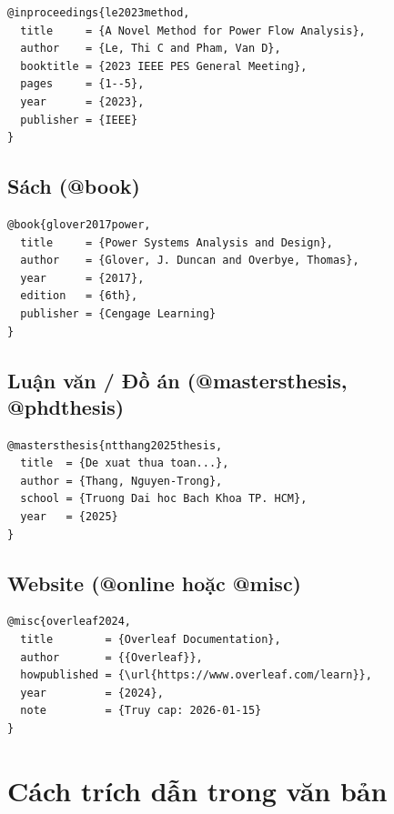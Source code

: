 \begin{lstlisting}[style=latexstyle, caption={Entry @inproceedings mẫu}]
@inproceedings{le2023method,
  title     = {A Novel Method for Power Flow Analysis},
  author    = {Le, Thi C and Pham, Van D},
  booktitle = {2023 IEEE PES General Meeting},
  pages     = {1--5},
  year      = {2023},
  publisher = {IEEE}
}
\end{lstlisting}

\subsection{Sách (@book)}

\begin{lstlisting}[style=latexstyle, caption={Entry @book mẫu}]
@book{glover2017power,
  title     = {Power Systems Analysis and Design},
  author    = {Glover, J. Duncan and Overbye, Thomas},
  year      = {2017},
  edition   = {6th},
  publisher = {Cengage Learning}
}
\end{lstlisting}

\subsection{Luận văn / Đồ án (@mastersthesis, @phdthesis)}

\begin{lstlisting}[style=latexstyle, caption={Entry luận văn mẫu}]
@mastersthesis{ntthang2025thesis,
  title  = {De xuat thua toan...},
  author = {Thang, Nguyen-Trong},
  school = {Truong Dai hoc Bach Khoa TP. HCM},
  year   = {2025}
}
\end{lstlisting}

\subsection{Website (@online hoặc @misc)}

\begin{lstlisting}[style=latexstyle, caption={Entry website mẫu}]
@misc{overleaf2024,
  title        = {Overleaf Documentation},
  author       = {{Overleaf}},
  howpublished = {\url{https://www.overleaf.com/learn}},
  year         = {2024},
  note         = {Truy cap: 2026-01-15}
}
\end{lstlisting}

\section{Cách trích dẫn trong văn bản}

